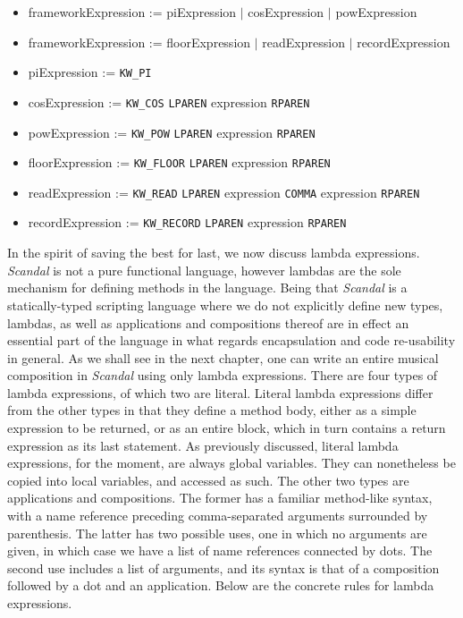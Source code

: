 \begin{itemize}
	\item frameworkExpression := piExpression $|$ cosExpression $|$ powExpression
	\item frameworkExpression := floorExpression $|$ readExpression $|$ recordExpression
	\item piExpression := \texttt{KW\_PI}
	\item cosExpression := \texttt{KW\_COS} \texttt{LPAREN} expression \texttt{RPAREN}
	\item powExpression := \texttt{KW\_POW} \texttt{LPAREN} expression \texttt{RPAREN}
	\item floorExpression := \texttt{KW\_FLOOR} \texttt{LPAREN} expression \texttt{RPAREN}
	\item readExpression := \texttt{KW\_READ} \texttt{LPAREN} expression \texttt{COMMA} expression \texttt{RPAREN}
	\item recordExpression := \texttt{KW\_RECORD} \texttt{LPAREN} expression \texttt{RPAREN}
\end{itemize}

In the spirit of saving the best for last, we now discuss lambda expressions. \emph{Scandal} is not a pure functional language, however lambdas are the sole mechanism for defining methods in the language. Being that \emph{Scandal} is a statically-typed scripting language where we do not explicitly define new types, lambdas, as well as applications and compositions thereof are in effect an essential part of the language in what regards encapsulation and code re-usability in general. As we shall see in the next chapter, one can write an entire musical composition in \emph{Scandal} using only lambda expressions. There are four types of lambda expressions, of which two are literal. Literal lambda expressions differ from the other types in that they define a method body, either as a simple expression to be returned, or as an entire block, which in turn contains a return expression as its last statement. As previously discussed, literal lambda expressions, for the moment, are always global variables. They can nonetheless be copied into local variables, and accessed as such. The other two types are applications and compositions. The former has a familiar method-like syntax, with a name reference preceding comma-separated arguments surrounded by parenthesis. The latter has two possible uses, one in which no arguments are given, in which case we have a list of name references connected by dots. The second use includes a list of arguments, and its syntax is that of a composition followed by a dot and an application. Below are the concrete rules for lambda expressions.

